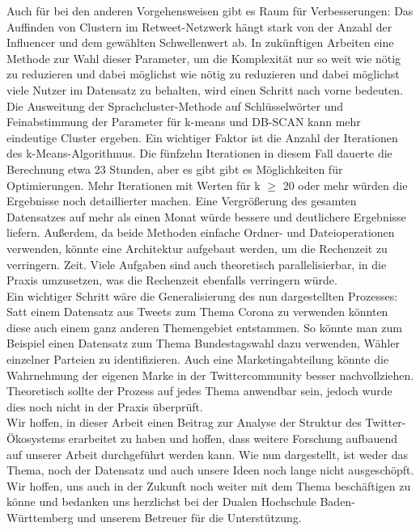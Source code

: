 Auch für bei den anderen Vorgehensweisen gibt es Raum für Verbesserungen: Das Auffinden von Clustern im Retweet-Netzwerk hängt stark von der Anzahl der Influencer und dem gewählten Schwellenwert ab. In zukünftigen Arbeiten eine Methode zur Wahl dieser Parameter, um die Komplexität nur so weit wie nötig zu reduzieren und dabei möglichst wie nötig zu reduzieren und dabei möglichst viele Nutzer im Datensatz zu behalten, wird einen Schritt nach vorne bedeuten. Die Ausweitung der Sprachcluster-Methode auf Schlüsselwörter und Feinabstimmung der Parameter für k-means und DB-SCAN kann mehr eindeutige Cluster ergeben. Ein wichtiger Faktor ist die Anzahl der Iterationen des k-Means-Algorithmus. Die fünfzehn Iterationen in diesem Fall dauerte die Berechnung etwa 23 Stunden, aber es gibt gibt es Möglichkeiten für Optimierungen. Mehr Iterationen mit Werten für k $\geq$ 20 oder mehr würden die Ergebnisse noch detaillierter machen. Eine Vergrößerung des gesamten Datensatzes auf mehr als einen Monat würde bessere und deutlichere Ergebnisse liefern. Außerdem, da beide Methoden einfache Ordner- und Dateioperationen verwenden, könnte eine Architektur aufgebaut werden, um die Rechenzeit zu verringern. Zeit. Viele Aufgaben sind auch theoretisch parallelisierbar, in die Praxis umzusetzen, was die Rechenzeit ebenfalls verringern würde. \\ \newline
Ein wichtiger Schritt wäre die Generalisierung des nun dargestellten Prozesses: Satt einem Datensatz aus Tweets zum Thema Corona zu verwenden könnten diese auch einem ganz anderen Themengebiet entstammen. So könnte man zum Beispiel einen Datensatz zum Thema Bundestagswahl dazu verwenden, Wähler einzelner Parteien zu identifizieren. Auch eine Marketingabteilung könnte die Wahrnehmung der eigenen Marke in der Twittercommunity besser nachvollziehen. Theoretisch sollte der Prozess auf jedes Thema anwendbar sein, jedoch wurde dies noch nicht in der Praxis überprüft. \\ \newline
Wir hoffen, in dieser Arbeit einen Beitrag zur Analyse der Struktur des Twitter-Ökosystems erarbeitet zu haben und hoffen, dass weitere Forschung aufbauend auf unserer Arbeit durchgeführt werden kann. Wie nun dargestellt, ist weder das Thema, noch der Datensatz und auch unsere Ideen noch lange nicht ausgeschöpft. Wir hoffen, uns auch in der Zukunft noch weiter mit dem Thema beschäftigen zu könne und bedanken uns herzlichst bei der Dualen Hochschule Baden-Württemberg und unserem Betreuer für die Unterstützung. 

